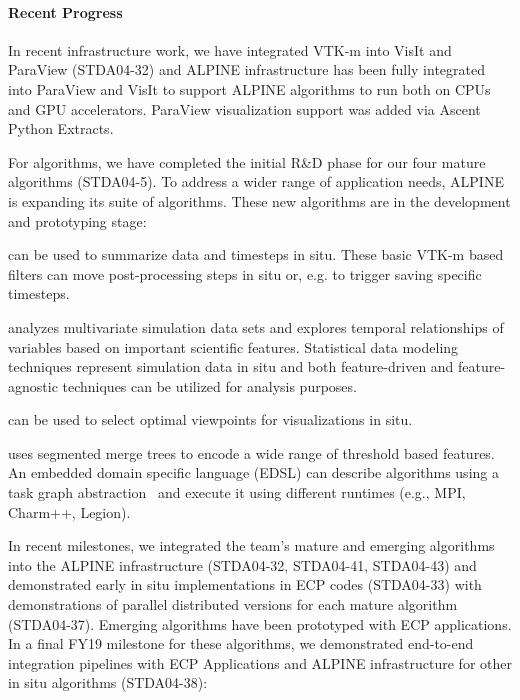 \paragraph{Recent Progress}

In recent infrastructure work, we have  integrated VTK-m into VisIt and ParaView (STDA04-32) and 
ALPINE infrastructure has been fully integrated into ParaView and VisIt to support ALPINE algorithms to run both on CPUs and GPU accelerators.  
ParaView visualization support was added via  Ascent Python Extracts.  

For algorithms, we have completed the initial R\&D phase for our four mature algorithms (STDA04-5).  
To address a wider range of application needs, ALPINE is expanding its suite of algorithms.  These new algorithms are in the development and prototyping stage:
\begin{description}
	\setlength{\itemsep}{1pt}
	\setlength{\parskip}{0pt}
	\setlength{\parsep}{0pt}
	\item [Scalable Statistics] can be used to summarize data and timesteps in situ.  These basic VTK-m based filters can move post-processing steps in situ or, e.g. to trigger saving specific timesteps. 
	\item [Tracking over time]  analyzes multivariate simulation data sets and explores temporal relationships of variables based on  important scientific features. Statistical data modeling techniques represent simulation data in situ and both feature-driven and feature-agnostic techniques can be utilized for analysis purposes. 
	\item [Automated Viewpoint Selection] can be used to select optimal viewpoints for visualizations in situ.  
	\item [Feature extraction] uses segmented merge trees to encode a wide range of threshold based features.  An embedded domain specific language (EDSL) can describe algorithms using a  task graph abstraction~\cite{Petruzza:IPDPS18} and execute it using different runtimes (e.g., MPI, Charm++, Legion).
\end{description}

In recent milestones, we integrated the team’s mature and emerging algorithms into the ALPINE infrastructure (STDA04-32, STDA04-41, STDA04-43) and demonstrated early in situ implementations in ECP codes (STDA04-33) with demonstrations of parallel distributed versions for each mature algorithm (STDA04-37).  Emerging algorithms have been prototyped with ECP applications.  
In a final FY19 milestone for these algorithms, we demonstrated end-to-end integration pipelines with ECP Applications and ALPINE infrastructure for other in situ algorithms (STDA04-38):

